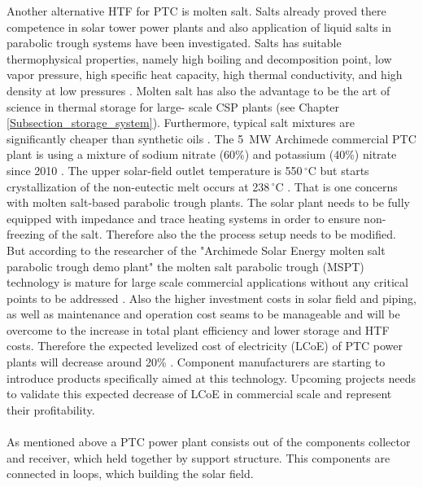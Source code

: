\documentclass[Master,MEE,english]{twbook}%
\begin{document}
Another alternative HTF for PTC is molten salt. Salts already proved there competence in solar tower power plants and also application of liquid salts in parabolic trough systems have been investigated. Salts has suitable thermophysical properties, namely high boiling and decomposition point, low vapor pressure, high specific heat capacity, high thermal conductivity, and high density at low pressures \cite{Cordaro2011}. Molten salt has also the advantage to be the art of science in thermal storage for large- scale CSP plants (see Chapter \ref{Subsection_storage_system}).  Furthermore, typical salt mixtures are significantly cheaper than synthetic oils \cite{Gil2010}. The 5~MW Archimede commercial PTC plant is using a mixture of sodium nitrate (60\%) and potassium (40\%) nitrate since 2010 \cite{NREL2012}. The upper solar-field outlet temperature is 550$\,^{\circ}\mathrm{C}$ but starts crystallization of the non-eutectic melt occurs at 238$\,^{\circ}\mathrm{C}$ \cite{Cordaro2011}. That is one concerns with molten salt-based parabolic trough plants. The solar plant needs to be fully equipped with impedance and trace heating systems in order to ensure non-freezing of the salt. Therefore also the the process setup needs to be modified. But according to the researcher of the "Archimede Solar Energy molten salt parabolic trough demo plant" the molten salt parabolic trough (MSPT) technology is mature for large scale commercial applications without any critical points to be addressed \cite{Maccari2015}. Also the higher investment costs in solar field and piping, as well as maintenance and operation cost seams to be manageable and will be overcome to the increase in total plant efficiency and lower storage and HTF costs. Therefore the expected levelized cost of electricity (LCoE) of PTC power plants will decrease around 20\% \cite{Richert2015}. Component manufacturers are starting to introduce products specifically aimed at this technology. Upcoming projects needs to validate this expected decrease of LCoE in commercial scale and represent their profitability. \\ 
\\
As mentioned above a PTC power plant consists out of the components collector and receiver, which held together by support structure. This components are connected in loops, which building the solar field.
\end{document}
